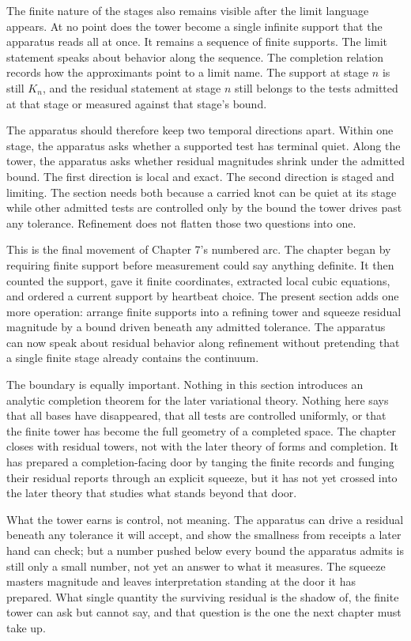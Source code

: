 The finite nature of the stages also remains visible after the limit language
appears. At no point does the tower become a single infinite support that the
apparatus reads all at once. It remains a sequence of finite supports. The
limit statement speaks about behavior along the sequence. The completion
relation records how the approximants point to a limit name. The support at
stage \(n\) is still \(K_n\), and the residual statement at stage \(n\) still
belongs to the tests admitted at that stage or measured against that stage's
bound.

The apparatus should therefore keep two temporal directions apart. Within one
stage, the apparatus asks whether a supported test has terminal quiet. Along
the tower, the apparatus asks whether residual magnitudes shrink under the
admitted bound. The first direction is local and exact. The second direction
is staged and limiting. The section needs both because a carried knot can be
quiet at its stage while other admitted tests are controlled only by the
bound the tower drives past any tolerance. Refinement does not flatten those two questions into one.

This is the final movement of Chapter 7's numbered arc. The chapter began by
requiring finite support before measurement could say anything definite. It
then counted the support, gave it finite coordinates, extracted local cubic
equations, and ordered a current support by heartbeat choice. The present
section adds one more operation: arrange finite supports into a refining
tower and squeeze residual magnitude by a bound driven beneath any admitted tolerance. The
apparatus can now speak about residual behavior along refinement without
pretending that a single finite stage already contains the continuum.

The boundary is equally important. Nothing in this section introduces an
analytic completion theorem for the later variational theory. Nothing here
says that all bases have disappeared, that all tests are controlled uniformly,
or that the finite tower has become the full geometry of a completed space.
The chapter closes with residual towers, not with the later theory of forms
and completion. It has prepared a completion-facing door by tanging the finite
records and funging their residual reports through an explicit squeeze, but it
has not yet crossed into the later theory that studies what stands beyond that
door.

What the tower earns is control, not meaning. The apparatus can drive a residual beneath any tolerance it will accept, and show the smallness from receipts a later hand can check; but a number pushed below every bound the apparatus admits is still only a small number, not yet an answer to what it measures. The squeeze masters magnitude and leaves interpretation standing at the door it has prepared. What single quantity the surviving residual is the shadow of, the finite tower can ask but cannot say, and that question is the one the next chapter must take up.

